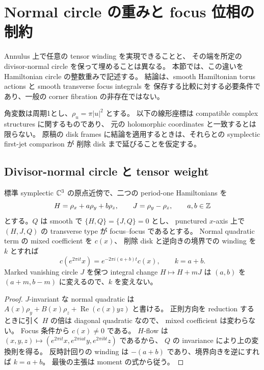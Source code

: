\section{Normal circle の重みと focus 位相の制約}
\label{cw:section}

Annulus 上で任意の tensor winding を実現できることと、
その端を所定の divisor-normal circle を保って埋めることは異なる。
本節では、この違いを Hamiltonian circle の整数重みで記述する。
結論は、smooth Hamiltonian torus actions と smooth transverse focus integrals を
保存する比較に対する必要条件であり、一般の corner fibration の非存在ではない。

角変数は周期1とし、$\rho_u=\pi|u|^2$ とする。
以下の線形座標は compatible complex structures に関するものであり、
元の holomorphic coordinates と一致するとは限らない。
原稿の disk frames に結論を適用するときは、それらとの symplectic first-jet comparison が
削除 disk まで延びることを仮定する。

\subsection{Divisor-normal circle と tensor weight}

\begin{proposition}\label{cw:weight}
標準 symplectic $\mathbb C^3$ の原点近傍で、二つの period-one Hamiltonians を
\[
 H=\rho_x+a\rho_y+b\rho_z,\qquad J=\rho_y-\rho_z,
 \qquad a,b\in\mathbb Z
\]
とする。$Q$ は smooth で $\{H,Q\}=\{J,Q\}=0$ とし、
punctured $x$-axis 上で $(H,J,Q)$ の transverse type が focus--focus であるとする。
Normal quadratic term の mixed coefficient を $c(x)$、
削除 disk と逆向きの境界での winding を $k$ とすれば
\[
 c(e^{2\pi it}x)=e^{-2\pi i(a+b)t}c(x),\qquad
 \boxed{k=a+b}.
\]
Marked vanishing circle $J$ を保つ integral change $H\mapsto H+mJ$ は
$(a,b)$ を $(a+m,b-m)$ に変えるので、$k$ を変えない。
\end{proposition}

\begin{proof}
$J$-invariant な normal quadratic は
$A(x)\rho_y+B(x)\rho_z+\operatorname{Re}(c(x)yz)$ と書ける。
正則方向を reduction するときに引く $H$ の倍は diagonal quadratic なので、
mixed coefficient は変わらない。
Focus 条件から $c(x)\ne0$ である。
$H$-flow は $(x,y,z)\mapsto
(e^{2\pi it}x,e^{2\pi iat}y,e^{2\pi ibt}z)$ であるから、
$Q$ の invariance により上の変換則を得る。
反時計回りの winding は $-(a+b)$ であり、境界向きを逆にすれば $k=a+b$。
最後の主張は moment の式から従う。
\end{proof}

